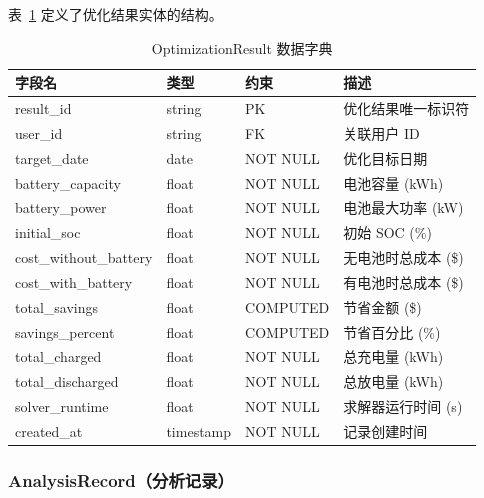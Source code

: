 表~\ref{tab:dd-optimization} 定义了优化结果实体的结构。

\begin{table}[htbp]
    \centering
    \caption{OptimizationResult 数据字典}
    \label{tab:dd-optimization}
    \begin{tabularx}{\textwidth}{@{}l l l X@{}}
        \toprule
        \textbf{字段名}           & \textbf{类型} & \textbf{约束} & \textbf{描述}  \\
        \midrule
        result\_id             & string      & PK          & 优化结果唯一标识符    \\
        user\_id               & string      & FK          & 关联用户 ID      \\
        target\_date           & date        & NOT NULL    & 优化目标日期       \\
        battery\_capacity      & float       & NOT NULL    & 电池容量 (kWh)   \\
        battery\_power         & float       & NOT NULL    & 电池最大功率 (kW)  \\
        initial\_soc           & float       & NOT NULL    & 初始 SOC (\%)  \\
        cost\_without\_battery & float       & NOT NULL    & 无电池时总成本 (\$) \\
        cost\_with\_battery    & float       & NOT NULL    & 有电池时总成本 (\$) \\
        total\_savings         & float       & COMPUTED    & 节省金额 (\$)    \\
        savings\_percent       & float       & COMPUTED    & 节省百分比 (\%)   \\
        total\_charged         & float       & NOT NULL    & 总充电量 (kWh)   \\
        total\_discharged      & float       & NOT NULL    & 总放电量 (kWh)   \\
        solver\_runtime        & float       & NOT NULL    & 求解器运行时间 (s)  \\
        created\_at            & timestamp   & NOT NULL    & 记录创建时间       \\
        \bottomrule
    \end{tabularx}
\end{table}

\subsubsection{AnalysisRecord（分析记录）}

